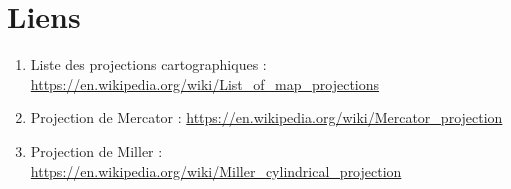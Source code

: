 \section{Liens}

\begin{enumerate}
\item Liste des projections cartographiques : \url{https://en.wikipedia.org/wiki/List_of_map_projections}
\item Projection de Mercator : \url{https://en.wikipedia.org/wiki/Mercator_projection}
\item Projection de Miller : \url{https://en.wikipedia.org/wiki/Miller_cylindrical_projection}
\end{enumerate}
